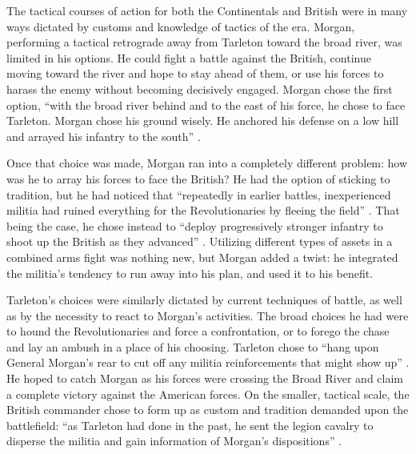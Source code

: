 The tactical courses of action for both the Continentals and British were in
many ways dictated by customs and knowledge of tactics of the era.  Morgan,
performing a tactical retrograde away from Tarleton toward the broad river, was
limited in his options.  He could fight a battle against the British, continue
moving toward the river and hope to stay ahead of them, or use his forces to
harass the enemy without becoming decisively engaged.  Morgan chose the first
option, ``with the broad river behind and to the east of his force, he chose to
face Tarleton.  Morgan chose his ground wisely.  He anchored his defense on a
low hill and arrayed his infantry to the south'' \cite[32]{brinkley_back_1998}.

Once that choice was made, Morgan ran into a completely different problem: how
was he to array his forces to face the British?  He had the option of sticking
to tradition, but he had noticed that ``repeatedly in earlier battles,
inexperienced militia had ruined everything for the Revolutionaries by fleeing
the field'' \cite[30]{weigley_partisan_1970}.  That being the case, he chose
instead to ``deploy progressively stronger infantry to shoot up the British as
they advanced'' \cite[71]{babits_devil_2001}.  Utilizing different types of
assets in a combined arms fight was nothing new, but Morgan added a twist: he
integrated the militia's tendency to run away into his plan, and used it to his
benefit.  

Tarleton's choices were similarly dictated by current techniques of battle, as
well as by the necessity to react to Morgan's activities.  The broad choices he
had were to hound the Revolutionaries and force a confrontation, or to forego
the chase and lay an ambush in a place of his choosing.  Tarleton chose to
``hang upon General Morgan's rear to cut off any militia reinforcements that
might show up'' \cite[46]{fleming_cowpens_1988}.  He hoped to catch Morgan as
his forces were crossing the Broad River and claim a complete victory against
the American forces.  On the smaller, tactical scale, the British commander
chose to form up as custom and tradition demanded upon the battlefield:  ``as
Tarleton had done in the past, he sent the legion cavalry to disperse the
militia and gain information of Morgan's dispositions''
\cite[33]{brinkley_back_1998}. 

